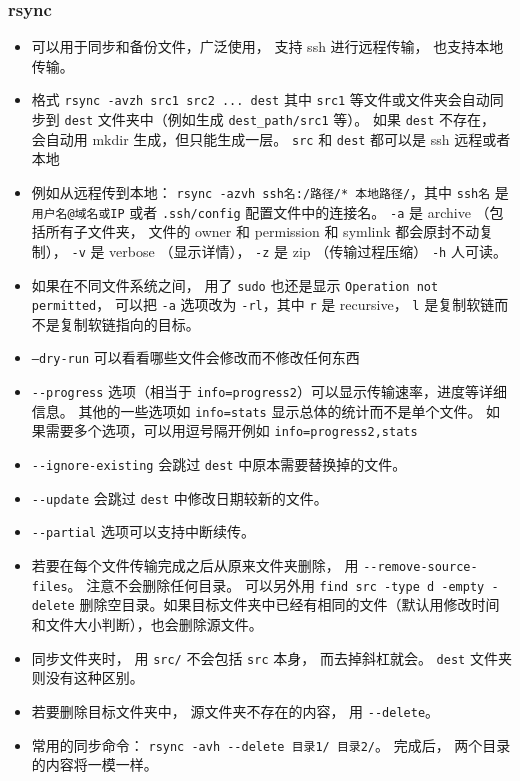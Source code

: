 \subsubsection{rsync}
\begin{itemize}
\item 可以用于同步和备份文件，广泛使用， 支持 ssh 进行远程传输， 也支持本地传输。
\item 格式 \verb`rsync -avzh src1 src2 ... dest` 其中 \verb|src1| 等文件或文件夹会自动同步到 \verb|dest| 文件夹中（例如生成 \verb`dest_path/src1` 等）。 如果 \verb|dest| 不存在， 会自动用 mkdir 生成，但只能生成一层。 \verb`src` 和 \verb|dest| 都可以是 ssh 远程或者本地
\item 例如从远程传到本地： \verb|rsync -azvh ssh名:/路径/* 本地路径/|，其中 \verb`ssh名` 是 \verb`用户名@域名或IP` 或者 \verb`.ssh/config` 配置文件中的连接名。 \verb`-a` 是 archive （包括所有子文件夹， 文件的 owner 和 permission 和 symlink 都会原封不动复制）， \verb`-v` 是 verbose （显示详情）， \verb`-z` 是 zip （传输过程压缩） \verb`-h` 人可读。
\item 如果在不同文件系统之间， 用了 \verb|sudo| 也还是显示 \verb|Operation not permitted|， 可以把 \verb|-a| 选项改为 \verb|-rl|，其中 \verb|r| 是 recursive， \verb|l| 是复制软链而不是复制软链指向的目标。
\item \verb|–dry-run| 可以看看哪些文件会修改而不修改任何东西
\item \verb|--progress| 选项（相当于 \verb|info=progress2|）可以显示传输速率，进度等详细信息。 其他的一些选项如 \verb|info=stats| 显示总体的统计而不是单个文件。 如果需要多个选项，可以用逗号隔开例如 \verb|info=progress2,stats|
\item \verb`--ignore-existing` 会跳过 \verb`dest` 中原本需要替换掉的文件。
\item \verb`--update` 会跳过 \verb`dest` 中修改日期较新的文件。
\item \verb|--partial| 选项可以支持中断续传。
\item 若要在每个文件传输完成之后从原来文件夹删除， 用 \verb`--remove-source-files`。 注意不会删除任何目录。 可以另外用 \verb|find src -type d -empty -delete| 删除空目录。如果目标文件夹中已经有相同的文件（默认用修改时间和文件大小判断），也会删除源文件。
\item 同步文件夹时， 用 \verb|src/| 不会包括 \verb|src| 本身， 而去掉斜杠就会。 \verb`dest` 文件夹则没有这种区别。
\item 若要删除目标文件夹中， 源文件夹不存在的内容， 用 \verb`--delete`。
\item 常用的同步命令： \verb|rsync -avh --delete 目录1/ 目录2/|。 完成后， 两个目录的内容将一模一样。

\end{itemize}
